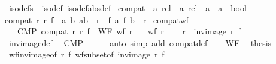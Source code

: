 \begin{isabellebody}
\ iso{\isacharunderscore}{\kern0pt}defs\ {\isacharequal}{\kern0pt}\ iso{\isacharunderscore}{\kern0pt}def\ iso{\isacharunderscore}{\kern0pt}def{\isacharbrackleft}{\kern0pt}abs{\isacharunderscore}{\kern0pt}def{\isacharbrackright}{\kern0pt}\isanewline
\isanewline
{}\isamarkupfalse%
\ compat\ {\isacharcolon}{\kern0pt}{\isacharcolon}{\kern0pt}\ {\isachardoublequoteopen}{\isacharprime}{\kern0pt}a\ rel\ {\isasymRightarrow}\ {\isacharprime}{\kern0pt}a{\isacharprime}{\kern0pt}\ rel\ {\isasymRightarrow}\ {\isacharparenleft}{\kern0pt}{\isacharprime}{\kern0pt}a\ {\isasymRightarrow}\ {\isacharprime}{\kern0pt}a{\isacharprime}{\kern0pt}{\isacharparenright}{\kern0pt}\ {\isasymRightarrow}\ bool{\isachardoublequoteclose}\isanewline
{}\isanewline
{\isachardoublequoteopen}compat\ r\ r{\isacharprime}{\kern0pt}\ f\ {\isasymequiv}\ {\isasymforall}a\ b{\isachardot}{\kern0pt}\ {\isacharparenleft}{\kern0pt}a{\isacharcomma}{\kern0pt}b{\isacharparenright}{\kern0pt}\ {\isasymin}\ r\ {\isasymlongrightarrow}\ {\isacharparenleft}{\kern0pt}f\ a{\isacharcomma}{\kern0pt}\ f\ b{\isacharparenright}{\kern0pt}\ {\isasymin}\ r{\isacharprime}{\kern0pt}{\isachardoublequoteclose}\isanewline
\isanewline
{}\isamarkupfalse%
\ compat{\isacharunderscore}{\kern0pt}wf{\isacharcolon}{\kern0pt}\isanewline
\ \ \ CMP{\isacharcolon}{\kern0pt}\ {\isachardoublequoteopen}compat\ r\ r{\isacharprime}{\kern0pt}\ f{\isachardoublequoteclose}\ \ WF{\isacharcolon}{\kern0pt}\ {\isachardoublequoteopen}wf\ r{\isacharprime}{\kern0pt}{\isachardoublequoteclose}\isanewline
\ \ \ {\isachardoublequoteopen}wf\ r{\isachardoublequoteclose}\isanewline
%
\isadelimproof
%
\endisadelimproof
%
\isatagproof
{}\isamarkupfalse%
{\isacharminus}{\kern0pt}\isanewline
\ \ \isamarkupfalse%
\ {\isachardoublequoteopen}r\ {\isasymle}\ inv{\isacharunderscore}{\kern0pt}image\ r{\isacharprime}{\kern0pt}\ f{\isachardoublequoteclose}\isanewline
\ \ \ \ \isamarkupfalse%
\ inv{\isacharunderscore}{\kern0pt}image{\isacharunderscore}{\kern0pt}def\ \isamarkupfalse%
\ CMP\isanewline
\ \ \ \ \isamarkupfalse%
\ {\isacharparenleft}{\kern0pt}auto\ simp\ add{\isacharcolon}{\kern0pt}\ compat{\isacharunderscore}{\kern0pt}def{\isacharparenright}{\kern0pt}\isanewline
\ \ \isamarkupfalse%
\ WF\ \isamarkupfalse%
\ {\isacharquery}{\kern0pt}thesis\isanewline
\ \ \ \ \isamarkupfalse%
\ wf{\isacharunderscore}{\kern0pt}inv{\isacharunderscore}{\kern0pt}image{\isacharbrackleft}{\kern0pt}of\ r{\isacharprime}{\kern0pt}\ f{\isacharbrackright}{\kern0pt}\ wf{\isacharunderscore}{\kern0pt}subset{\isacharbrackleft}{\kern0pt}of\ {\isachardoublequoteopen}inv{\isacharunderscore}{\kern0pt}image\ r{\isacharprime}{\kern0pt}\ f{\isachardoublequoteclose}{\isacharbrackright}{\kern0pt}\ \isamarkupfalse%

\end{isabellebody}
